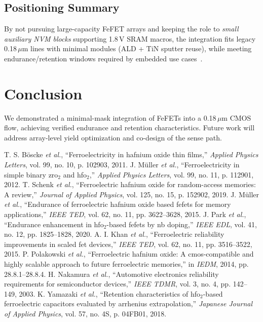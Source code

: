 \documentclass[journal]{IEEEtran}
\begin{document}
\subsection*{Positioning Summary}
By not pursuing large-capacity FeFET arrays and keeping the role to \emph{small auxiliary NVM blocks} supporting 1.8\,V SRAM macros, the integration fits legacy 0.18\,$\mu$m lines with minimal modules (ALD + TiN sputter reuse), while meeting endurance/retention windows required by embedded use cases~\cite{Polakowski2014,Nakamura2003}.

\section{Conclusion}
We demonstrated a minimal-mask integration of FeFETs into a 0.18\,$\mu$m CMOS flow, achieving verified endurance and retention characteristics. Future work will address array-level yield optimization and co-design of the sense path.


\begin{thebibliography}{9}
 T. S. Böscke \emph{et al.}, ``Ferroelectricity in hafnium oxide thin films,'' \emph{Applied Physics Letters}, vol. 99, no. 10, p. 102903, 2011.
 J. Müller \emph{et al.}, ``Ferroelectricity in simple binary zro$_2$ and hfo$_2$,'' \emph{Applied Physics Letters}, vol. 99, no. 11, p. 112901, 2012.
 T. Schenk \emph{et al.}, ``Ferroelectric hafnium oxide for random-access memories: A review,'' \emph{Journal of Applied Physics}, vol. 125, no. 15, p. 152902, 2019.
 J. Müller \emph{et al.}, ``Endurance of ferroelectric hafnium oxide based fefets for memory applications,'' \emph{IEEE TED}, vol. 62, no. 11, pp. 3622--3628, 2015.
 J. Park \emph{et al.}, ``Endurance enhancement in hfo$_2$-based fefets by nb doping,'' \emph{IEEE EDL}, vol. 41, no. 12, pp. 1825--1828, 2020.
 A. I. Khan \emph{et al.}, ``Ferroelectric reliability improvements in scaled fet devices,'' \emph{IEEE TED}, vol. 62, no. 11, pp. 3516--3522, 2015.
 P. Polakowski \emph{et al.}, ``Ferroelectric hafnium oxide: A cmos-compatible and highly scalable approach to future ferroelectric memories,'' in \emph{IEDM}, 2014, pp. 28.8.1--28.8.4.
 H. Nakamura \emph{et al.}, ``Automotive electronics reliability requirements for semiconductor devices,'' \emph{IEEE TDMR}, vol. 3, no. 4, pp. 142--149, 2003.
 K. Yamazaki \emph{et al.}, ``Retention characteristics of hfo$_2$-based ferroelectric capacitors evaluated by arrhenius extrapolation,'' \emph{Japanese Journal of Applied Physics}, vol. 57, no. 4S, p. 04FB01, 2018.
\end{thebibliography}
\end{document}
